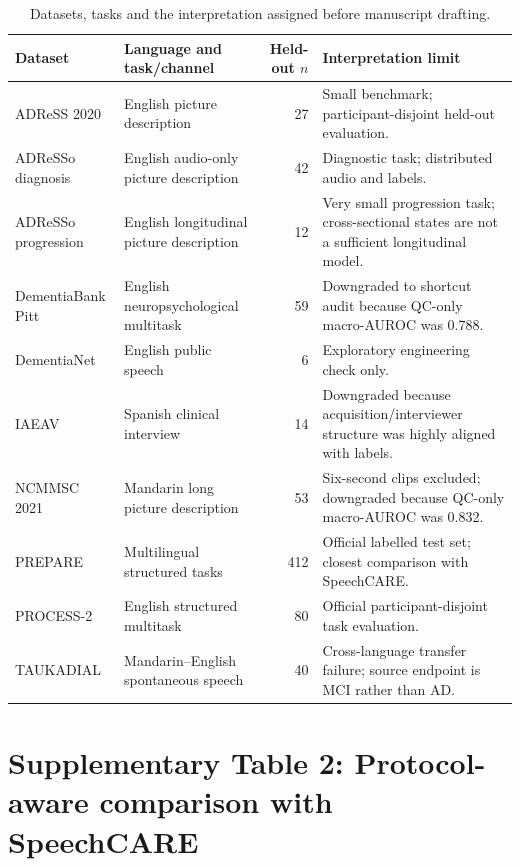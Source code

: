 \documentclass[pdflatex,sn-nature]{sn-jnl}
\begin{document}
\begin{table}[t]
\caption{Datasets, tasks and the interpretation assigned before manuscript drafting.}
\centering
\scriptsize
\begin{tabularx}{\textwidth}{>{\raggedright\arraybackslash}p{2.4cm} >{\raggedright\arraybackslash}p{3.2cm} r Y}
\toprule
Dataset & Language and task/channel & Held-out $n$ & Interpretation limit \\
\midrule
ADReSS 2020 & English picture description & 27 & Small benchmark; participant-disjoint held-out evaluation. \\
ADReSSo diagnosis & English audio-only picture description & 42 & Diagnostic task; distributed audio and labels. \\
ADReSSo progression & English longitudinal picture description & 12 & Very small progression task; cross-sectional states are not a sufficient longitudinal model. \\
DementiaBank Pitt & English neuropsychological multitask & 59 & Downgraded to shortcut audit because QC-only macro-AUROC was 0.788. \\
DementiaNet & English public speech & 6 & Exploratory engineering check only. \\
IAEAV & Spanish clinical interview & 14 & Downgraded because acquisition/interviewer structure was highly aligned with labels. \\
NCMMSC 2021 & Mandarin long picture description & 53 & Six-second clips excluded; downgraded because QC-only macro-AUROC was 0.832. \\
PREPARE & Multilingual structured tasks & 412 & Official labelled test set; closest comparison with SpeechCARE. \\
PROCESS-2 & English structured multitask & 80 & Official participant-disjoint task evaluation. \\
TAUKADIAL & Mandarin--English spontaneous speech & 40 & Cross-language transfer failure; source endpoint is MCI rather than AD. \\
\bottomrule
\end{tabularx}
\end{table}
\clearpage

\section*{Supplementary Table 2: Protocol-aware comparison with SpeechCARE}
\end{document}
